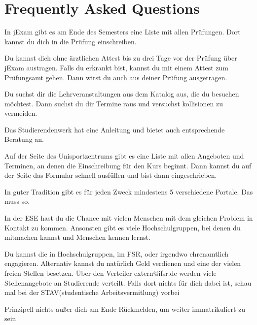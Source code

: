 \chapter*{Frequently Asked Questions}
\label{sec:faq}
In jExam  gibt es am Ende des Semesters eine Liste mit allen Prüfungen. Dort kannst du dich in die Prüfung einschreiben.

Du kannst dich ohne ärztlichen Attest bis zu drei Tage vor der Prüfung über jExam austragen. Falls du erkrankt bist, kannst du mit einem Attest zum Prüfungsamt gehen. Dann wirst du auch aus deiner Prüfung ausgetragen.

Du suchst dir die Lehrveranstaltungen aus dem Katalog aus, die du besuchen möchtest. Dann suchst du dir Termine raus und versuchst kollisionen zu vermeiden.

Das Studierendenwerk hat eine Anleitung und bietet auch entsprechende Beratung an.

Auf der Seite des Unisportzentrums gibt es eine Liste mit allen Angeboten und Terminen, an denen die Einschreibung für den Kurs beginnt. Dann kannst du auf der Seite das Formular schnell ausfüllen und bist dann eingeschrieben.

In guter Tradition gibt es für jeden Zweck mindestens 5 verschiedene Portale. Das muss so.

In der ESE hast du die Chance mit vielen Menschen mit dem gleichen Problem in Kontakt zu kommen. Ansonsten gibt es viele Hochschulgruppen, bei denen du mitmachen kannst und Menschen kennen lernst.

Du kannst die in Hochschulgruppen, im FSR, oder irgendwo ehrenamtlich engagieren. Alternativ kannst du natürlich Geld verdienen und eine der vielen freien Stellen besetzen. Über den Verteiler extern@ifsr.de werden viele Stellenangebote an Studierende verteilt. Falls dort nichts für dich dabei ist, schau mal bei der STAV(studentische Arbeitsvermitlung) vorbei

Prinzipell nichts außer dich am Ende Rückmelden, um weiter immatrikuliert zu sein

